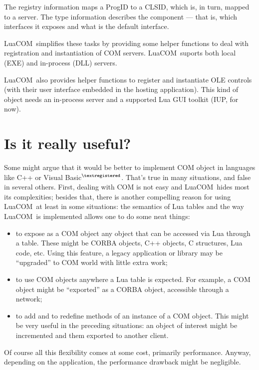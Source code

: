 \documentclass[11pt,a4paper,english]{report}
\newcommand{\techname}[1]{\mbox{#1}}
\newcommand{\luacom}{\techname{LuaCOM}}
\newcommand{\registered}{$^{\textregistered}$}
\begin{document}
The registry information maps a ProgID to a CLSID, which is, in
turn, mapped to a server. The type information describes the
component --- that is, which interfaces it exposes and what is the
default interface.

\luacom\ simplifies these tasks by providing some helper functions to
deal with registration and instantiation of COM servers. \luacom\ suports
both local (EXE) and in-process (DLL) servers.

\luacom\ also provides helper functions to register and instantiate
OLE controls (with their user interface embedded in the hosting
application). This kind of object needs an in-process server and a
supported Lua GUI toolkit (IUP, for now).

\section{Is it really useful?}
Some might argue that it would be better to implement COM object in
languages like C++ or Visual Basic\registered . That's true in many
situations, and false in several others. First, dealing with COM is
not easy and \luacom\ hides most its complexities; besides that, there
is another compelling reason for using \luacom\, at least in some
situations: the semantics of Lua tables and the way \luacom\ is
implemented allows one to do some neat things:

\begin{itemize}
\item to expose as a COM object any object that can be accessed via
Lua through a table. These might be CORBA objects, C++ objects, C
structures, Lua code, etc. Using this feature, a legacy application or
library may be ``upgraded'' to COM world with little extra work;

\item to use COM objects anywhere a Lua table is expected. For
example, a COM object might be ``exported'' as a CORBA object,
accessible through a network;

\item to add and to redefine methods of an instance of a COM
object. This might be very useful in the preceding situations: an
object of interest might be incremented and them exported to another
client.

\end{itemize}

Of course all this flexibility comes at some cost, primarily
performance. Anyway, depending on the application, the performance
drawback might be negligible.
\end{document}
